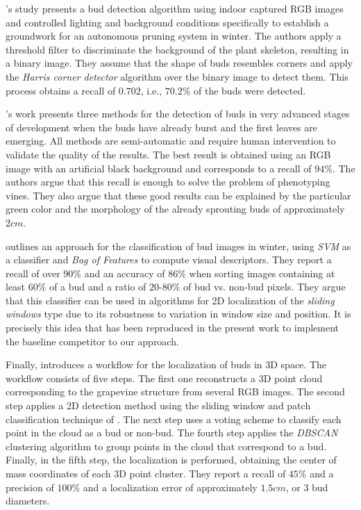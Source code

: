 \documentclass[a4paper,authoryear,review]{elsarticle}
\begin{document}
	\citet{xu2014detection}’s study presents a bud detection algorithm using indoor captured RGB images and controlled lighting and background conditions specifically to establish a groundwork for an autonomous pruning system in winter. The authors apply a threshold filter to discriminate the background of the plant skeleton, resulting in a binary image. They assume that the shape of buds resembles corners and apply the \emph{Harris corner detector} algorithm over the binary image to detect them. This process obtains a recall of $0.702$, i.e., $70.2\%$ of the buds were detected. 
	
	\citet{herzog2014initial}’s work presents three methods for the detection of buds in very advanced stages of development when the buds have already burst and the first leaves are emerging. All methods are semi-automatic and require human intervention to validate the quality of the results. The best result is obtained using an RGB image with an artificial black background and corresponds to a recall of $94\%$. The authors argue that this recall is enough to solve the problem of phenotyping vines. They also argue that these good results can be explained by the particular green color and the morphology of the already sprouting buds of approximately $2cm$. 
	
	\citet{perez2017image} outlines an approach for the classification of bud images in winter, using \emph{SVM} as a classifier and \emph{Bag of Features} to compute visual descriptors. They report a recall of over $90\%$ and an accuracy of $86\%$ when sorting images containing at least $60\%$ of a bud and a ratio of $20$-$80\%$ of bud vs. non-bud pixels. They argue that this classifier can be used in algorithms for 2D localization of the \emph{sliding windows} type due to its robustness to variation in window size and position. It is precisely this idea that has been reproduced in the present work to implement the baseline competitor to our approach.
	
	Finally, \citet{diaz2018grapevine} introduces a workflow for the localization of buds in 3D space. The workflow consists of five steps. The first one reconstructs a 3D point cloud corresponding to the grapevine structure from several RGB images. The second step applies a 2D detection method using the sliding window and patch classification technique of \citet{perez2017image}. The next step uses a voting scheme to classify each point in the cloud as a bud or non-bud. The fourth step applies the \emph{DBSCAN} clustering algorithm to group points in the cloud that correspond to a bud. Finally, in the fifth step, the localization is performed, obtaining the center of mass coordinates of each 3D point cluster. They report a recall of $45\%$ and a precision of $100\%$ and a localization error of approximately $1.5cm$, or 3 bud diameters. 
	
\end{document}
